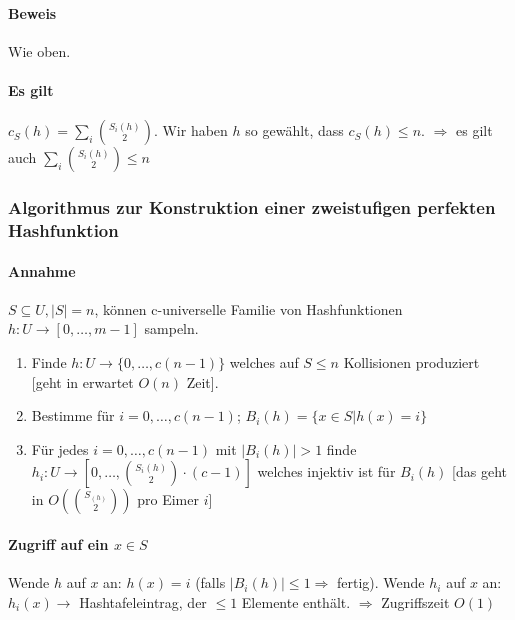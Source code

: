 \paragraph*{Beweis} Wie oben.



\paragraph*{Es gilt} $c_S(h) = \sum\limits_i {S_i(h) \choose 2}$. Wir haben $h$ so gewählt, dass $c_S(h) \leq n$.
$\Rightarrow$ es gilt auch $\sum\limits_i {S_i(h) \choose 2} \leq n$





\subsubsection{Algorithmus zur Konstruktion einer zweistufigen perfekten Hashfunktion}

\paragraph*{Annahme} $S \subseteq U, |S|=n$, können c-universelle Familie von Hashfunktionen $h: U \rightarrow [0,\dots,m-1]$ sampeln.

\begin{enumerate}
	\item Finde $h : U \rightarrow \{ 0,\dots,c(n-1) \}$ welches auf $S \leq n$ Kollisionen produziert [geht in erwartet $O(n)$ Zeit]. 
	\item Bestimme für $i=0,\dots,c(n-1)$; $B_i(h)= \{ x \in S | h(x)=i \}$
	\item Für jedes $i=0,\dots,c(n-1)$ mit $|B_i(h)|>1$ finde $h_i : U \rightarrow [0,\dots,{S_i(h) \choose 2} \cdot (c-1)]$ welches injektiv ist für $B_i(h)$ [das geht in $O({S_(h) \choose 2})$ pro Eimer $i$]
\end{enumerate}

\paragraph*{Zugriff auf ein $x \in S$} Wende $h$ auf $x$ an: $h(x)=i$ (falls $|B_i(h)| \leq 1 \Rightarrow$ fertig). Wende $h_i$ auf $x$ an: $h_i(x) \rightarrow$ Hashtafeleintrag, der $\leq 1$ Elemente enthält. $\Rightarrow$ Zugriffszeit $O(1)$